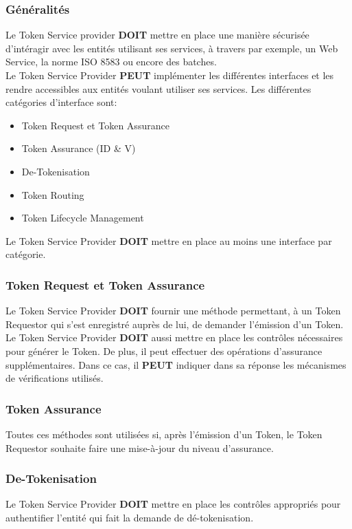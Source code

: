 \documentclass{report}
\begin{document}
\subsubsection{Généralités}
Le Token Service provider \textbf{DOIT} mettre en place une manière sécurisée d'intéragir avec les entités utilisant ses services, à travers par exemple, un Web Service, la norme ISO 8583 ou encore des batches.\\
Le Token Service Provider \textbf{PEUT} implémenter les différentes interfaces et les rendre accessibles aux entités voulant utiliser ses services. Les différentes catégories d'interface sont:
\begin{itemize}
	\item Token Request et Token Assurance
	\item Token Assurance (ID \& V)
	\item De-Tokenisation
	\item Token Routing
	\item Token Lifecycle Management
\end{itemize}
\noindent
Le Token Service Provider \textbf{DOIT} mettre en place au moins une interface par catégorie.

\subsubsection{Token Request et Token Assurance}
Le Token Service Provider \textbf{DOIT} fournir une méthode permettant, à un Token Requestor qui s'est enregistré auprès de lui, de demander l'émission d'un Token.
Le Token Service Provider \textbf{DOIT} aussi mettre en place les contrôles nécessaires pour générer le Token. De plus, il peut effectuer des opérations d'assurance supplémentaires. Dans ce cas, il \textbf{PEUT} indiquer dans sa réponse les mécanismes de vérifications utilisés. 

\subsubsection{Token Assurance}
Toutes ces méthodes sont utilisées si, après l'émission d'un Token, le Token Requestor souhaite faire une mise-à-jour du niveau d'assurance.

\subsubsection{De-Tokenisation}
Le Token Service Provider \textbf{DOIT} mettre en place les contrôles appropriés pour authentifier l'entité qui fait la demande de dé-tokenisation.
\end{document}
